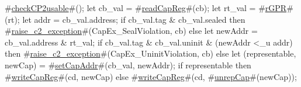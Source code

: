   #\hyperref[zcheckCP2usable]{checkCP2usable}#();
  let cb_val = #\hyperref[zreadCapReg]{readCapReg}#(cb);
  let rt_val = #\hyperref[zrGPR]{rGPR}#(rt);
  let addr = cb_val.address;
  if cb_val.tag & cb_val.sealed then
    #\hyperref[zraisezyc2zyexception]{raise\_c2\_exception}#(CapEx_SealViolation, cb)
  else
  {
    let newAddr = cb_val.address & rt_val;
    if cb_val.tag & cb_val.uninit & (newAddr <_u addr) then
      #\hyperref[zraisezyc2zyexception]{raise\_c2\_exception}#(CapEx_UninitViolation, cb)
    else {
      let (representable, newCap) = #\hyperref[zsetCapAddr]{setCapAddr}#(cb_val, newAddr);
      if representable then
	#\hyperref[zwriteCapReg]{writeCapReg}#(cd, newCap)
      else
	#\hyperref[zwriteCapReg]{writeCapReg}#(cd, #\hyperref[zunrepCap]{unrepCap}#(newCap));
    }
  }
